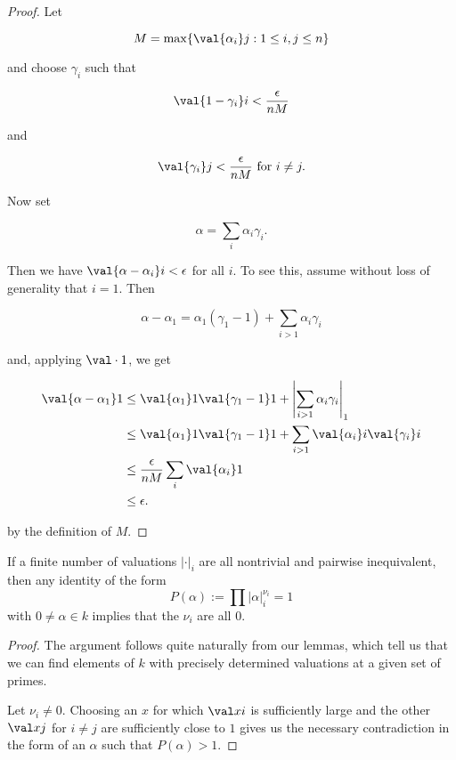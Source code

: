\begin{proof}
  Let

  \[ M = \max \{ \val {\alpha_i} j : 1\leq i, j\leq n \} \]

  and choose $\gamma_i$ such that

  \[ \val {1-\gamma_i} i < \frac\epsilon {nM}\]

  and

  \[\val {\gamma_i} j < \frac\epsilon{nM} \text { for } i\neq j. \]

  Now set

  \[ \alpha = \sum_i \alpha_i\gamma_i. \]

  Then we have $\val {\alpha-\alpha_i} i < \epsilon$ for all $i$. To see this,
  assume without loss of generality that $i = 1$. Then

  \[ \alpha - \alpha_1 = \alpha_1(\gamma_1 - 1) + \sum_{i>1}\alpha_i\gamma_i \]

  and, applying $\val \cdot 1$, we get

  \begin{align*}
    \val {\alpha-\alpha_1} 1 &\leq \val {\alpha_1} 1\val {\gamma_1 - 1} 1 + \left|{\sum_{i>1}\alpha_i\gamma_i}\right|_1\\
                             &\leq \val {\alpha_1} 1\val {\gamma_1 - 1} 1 + \sum_{i>1}\val {\alpha_i} i\val{\gamma_i}i \\
                             &\leq \frac \epsilon {nM} \sum_i \val {\alpha_i} 1 \\
                             &\leq \epsilon.
  \end{align*}

  by the definition of $M$.
\end{proof}

\begin{cor}
  \label{eq:corollary}
  If a finite number of valuations $|\cdot|_i$ are all nontrivial and pairwise
  inequivalent, then any identity of the form \[ P(\alpha) := \prod
    |\alpha|_{i}^{\nu_i} = 1\] with $0\neq \alpha\in k$ implies that the $\nu_i$
  are all $0$.
\end{cor}

\begin{proof}
  The argument follows quite naturally from our lemmas, which tell us that we can
  find elements of $k$ with precisely determined valuations at a given set of
  primes.

  Let $\nu_i\neq 0$. Choosing an $x$ for which $\val x i$ is sufficiently large
  and the other $\val x j$ for $i\neq j$ are sufficiently close to $1$ gives us
  the necessary contradiction in the form of an $\alpha$ such that $P(\alpha) >
  1$.
\end{proof}

